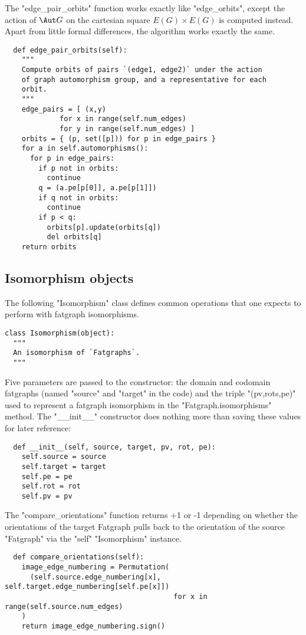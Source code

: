 The "edge_pair_orbits" function works exactly like "edge_orbits",
except the action of $\Aut G$ on the cartesian square $E(G) \times
E(G)$ is computed instead.  Apart from little formal differences, the
algorithm works exactly the same.
\begin{lstlisting}
  def edge_pair_orbits(self):
    """
    Compute orbits of pairs `(edge1, edge2)` under the action
    of graph automorphism group, and a representative for each
    orbit.
    """
    edge_pairs = [ (x,y) 
             for x in range(self.num_edges)
             for y in range(self.num_edges) ]
    orbits = { (p, set([p])) for p in edge_pairs }
    for a in self.automorphisms():
      for p in edge_pairs:
        if p not in orbits:
          continue
        q = (a.pe[p[0]], a.pe[p[1]])
        if q not in orbits:
          continue
        if p < q:
          orbits[p].update(orbits[q])
          del orbits[q]
    return orbits

\end{lstlisting}


\subsection{Isomorphism objects}
\label{sec:iso}

The following "Isomorphism" class defines common operations that one
expects to perform with fatgraph isomorphisms.
\begin{lstlisting}
class Isomorphism(object):
  """
  An isomorphism of `Fatgraphs`.
  """
\end{lstlisting}
Five parameters are passed to the constructor: the domain
and codomain fatgraphs (named "source" and "target" in the code) and
the triple "(pv,rots,pe)" used to represent a fatgraph isomorphism in
the "Fatgraph.isomorphisms" method.  The "__init__" constructor does
nothing more than saving these values for later reference:
\begin{lstlisting}
  def __init__(self, source, target, pv, rot, pe):
    self.source = source
    self.target = target
    self.pe = pe
    self.rot = rot
    self.pv = pv

\end{lstlisting}

The "compare_orientations" function returns +1 or -1 depending on
whether the orientations of the target Fatgraph pulls back to the
orientation of the source "Fatgraph" via the "self" "Isomorphism"
instance.
\begin{lstlisting}
  def compare_orientations(self):
    image_edge_numbering = Permutation(
      (self.source.edge_numbering[x], self.target.edge_numbering[self.pe[x]])
                                        for x in range(self.source.num_edges)
    )
    return image_edge_numbering.sign()

\end{lstlisting}

